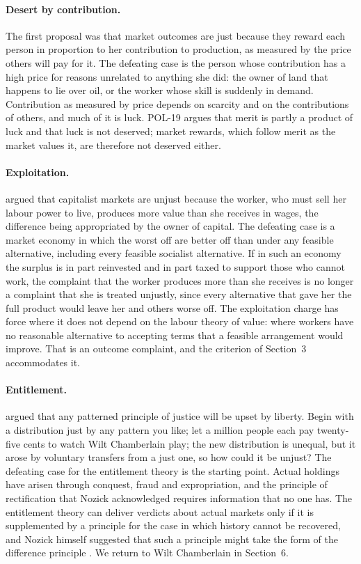\documentclass{situationist-preprint}
\begin{document}
\paragraph{Desert by contribution.} The first proposal was that market outcomes are just because they reward each person in proportion to her contribution to production, as measured by the price others will pay for it. The defeating case is the person whose contribution has a high price for reasons unrelated to anything she did: the owner of land that happens to lie over oil, or the worker whose skill is suddenly in demand. Contribution as measured by price depends on scarcity and on the contributions of others, and much of it is luck. POL-19 argues that merit is partly a product of luck and that luck is not deserved; market rewards, which follow merit as the market values it, are therefore not deserved either.

\paragraph{Exploitation.} \citet{Marx1867} argued that capitalist markets are unjust because the worker, who must sell her labour power to live, produces more value than she receives in wages, the difference being appropriated by the owner of capital. The defeating case is a market economy in which the worst off are better off than under any feasible alternative, including every feasible socialist alternative. If in such an economy the surplus is in part reinvested and in part taxed to support those who cannot work, the complaint that the worker produces more than she receives is no longer a complaint that she is treated unjustly, since every alternative that gave her the full product would leave her and others worse off. The exploitation charge has force where it does not depend on the labour theory of value: where workers have no reasonable alternative to accepting terms that a feasible arrangement would improve. That is an outcome complaint, and the criterion of Section~3 accommodates it.

\paragraph{Entitlement.} \citet[ch.~7]{Nozick1974} argued that any patterned principle of justice will be upset by liberty. Begin with a distribution just by any pattern you like; let a million people each pay twenty-five cents to watch Wilt Chamberlain play; the new distribution is unequal, but it arose by voluntary transfers from a just one, so how could it be unjust? The defeating case for the entitlement theory is the starting point. Actual holdings have arisen through conquest, fraud and expropriation, and the principle of rectification that Nozick acknowledged requires information that no one has. The entitlement theory can deliver verdicts about actual markets only if it is supplemented by a principle for the case in which history cannot be recovered, and Nozick himself suggested that such a principle might take the form of the difference principle \citep[ch.~7]{Nozick1974}. We return to Wilt Chamberlain in Section~6.
\end{document}
